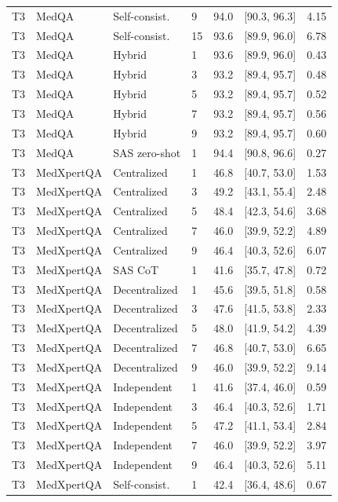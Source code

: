 \begin{table}[t]
\begin{tabular}{@{}llllrrr@{}}
T3 & MedQA & Self-consist. & 9 & 94.0 & [90.3, 96.3] & 4.15 \\
T3 & MedQA & Self-consist. & 15 & 93.6 & [89.9, 96.0] & 6.78 \\
T3 & MedQA & Hybrid & 1 & 93.6 & [89.9, 96.0] & 0.43 \\
T3 & MedQA & Hybrid & 3 & 93.2 & [89.4, 95.7] & 0.48 \\
T3 & MedQA & Hybrid & 5 & 93.2 & [89.4, 95.7] & 0.52 \\
T3 & MedQA & Hybrid & 7 & 93.2 & [89.4, 95.7] & 0.56 \\
T3 & MedQA & Hybrid & 9 & 93.2 & [89.4, 95.7] & 0.60 \\
T3 & MedQA & SAS zero-shot & 1 & 94.4 & [90.8, 96.6] & 0.27 \\
T3 & MedXpertQA & Centralized & 1 & 46.8 & [40.7, 53.0] & 1.53 \\
T3 & MedXpertQA & Centralized & 3 & 49.2 & [43.1, 55.4] & 2.48 \\
T3 & MedXpertQA & Centralized & 5 & 48.4 & [42.3, 54.6] & 3.68 \\
T3 & MedXpertQA & Centralized & 7 & 46.0 & [39.9, 52.2] & 4.89 \\
T3 & MedXpertQA & Centralized & 9 & 46.4 & [40.3, 52.6] & 6.07 \\
T3 & MedXpertQA & SAS CoT & 1 & 41.6 & [35.7, 47.8] & 0.72 \\
T3 & MedXpertQA & Decentralized & 1 & 45.6 & [39.5, 51.8] & 0.58 \\
T3 & MedXpertQA & Decentralized & 3 & 47.6 & [41.5, 53.8] & 2.33 \\
T3 & MedXpertQA & Decentralized & 5 & 48.0 & [41.9, 54.2] & 4.39 \\
T3 & MedXpertQA & Decentralized & 7 & 46.8 & [40.7, 53.0] & 6.65 \\
T3 & MedXpertQA & Decentralized & 9 & 46.0 & [39.9, 52.2] & 9.14 \\
T3 & MedXpertQA & Independent & 1 & 41.6 & [37.4, 46.0] & 0.59 \\
T3 & MedXpertQA & Independent & 3 & 46.4 & [40.3, 52.6] & 1.71 \\
T3 & MedXpertQA & Independent & 5 & 47.2 & [41.1, 53.4] & 2.84 \\
T3 & MedXpertQA & Independent & 7 & 46.0 & [39.9, 52.2] & 3.97 \\
T3 & MedXpertQA & Independent & 9 & 46.4 & [40.3, 52.6] & 5.11 \\
T3 & MedXpertQA & Self-consist. & 1 & 42.4 & [36.4, 48.6] & 0.67 \\

\end{tabular}
\end{table}

